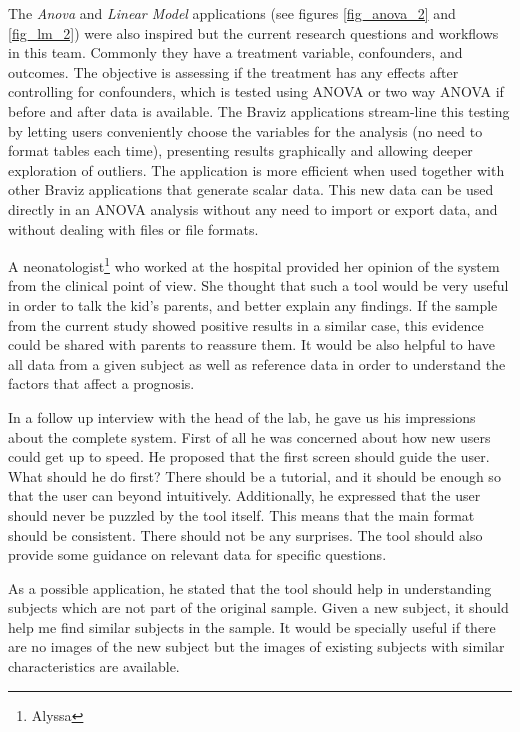 The \emph{Anova} and \emph{Linear Model} applications (see figures \ref{fig_anova_2} and \ref{fig_lm_2}) were also inspired but the current research questions and workflows in this team. Commonly they have a treatment variable, confounders, and outcomes. The objective is assessing if the treatment has any effects after controlling for confounders, which is tested using ANOVA or two way ANOVA if before and after data is available. The Braviz applications stream-line this testing by letting users conveniently choose the variables for the analysis (no need to format tables each time), presenting results graphically and allowing deeper exploration of outliers. The application is more efficient when used together with other Braviz applications that generate scalar data. This new data can be used directly in an ANOVA analysis without any need to import or export data, and without dealing with files or file formats.

% 


A neonatologist\footnote{Alyssa} who worked at the hospital provided her opinion of the system from the clinical point of view. She thought that such a tool would be very useful in order to talk the kid's parents, and better explain any findings. If the sample from the current study showed positive results in a similar case, this evidence could be shared with parents to reassure them. It would be also helpful to have all data from a given subject as well as reference data in order to understand the factors that affect a prognosis. 


In a follow up interview with the head of the lab, he gave us his impressions about the complete system. First of all he was concerned about how new users could get up to speed. He proposed that the first screen should guide the user. What should he do first? There should be a tutorial, and it should be enough so that the user can beyond intuitively. Additionally, he expressed that the user should never be puzzled by the tool itself. This means that the main format should be consistent. There should not be any surprises. The tool should also provide some guidance on relevant data for specific questions. 

As a possible application, he stated that the tool should help in understanding subjects which are not part of the original sample. Given a new subject, it should help me find similar subjects in the sample. It would be specially useful if there are no images of the new subject but the images of existing subjects with similar characteristics are available. 


